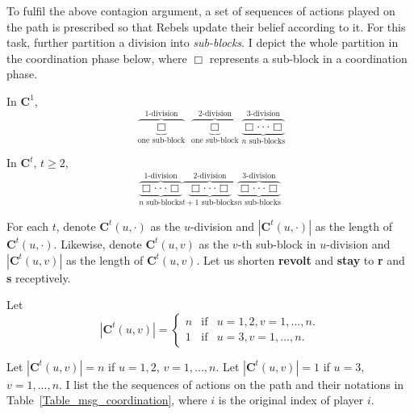 \documentclass[12pt,letter]{article}
\newcommand{\Kappa}{\mathbf{C}}
\theoremstyle{definition}
\theoremstyle{remark}
\theoremstyle{claim}
\begin{document}
To fulfil the above contagion argument, a set of sequences of actions played on the path is prescribed so that Rebels update their belief according to it. For this task, further partition a division into \textit{sub-blocks}. I depict the whole partition in the coordination phase below, where $\Box$ represents a sub-block in a coordination phase. 

In $\Kappa^1$, 
\[\overbrace{\underbrace{ \Box }_{\text{one sub-block}}}^{\text{$1$-division}} \overbrace{\underbrace{\Box }_{\text{one sub-block}}}^{\text{$2$-division}} \overbrace{\underbrace{\Box \cdot \cdot \cdot \Box}_{\text{$n$ sub-blocks}}}^{\text{$3$-division}}\] 

In $\Kappa^t$, $t\geq 2$,
\[\overbrace{\underbrace{\Box \cdot \cdot \cdot \Box}_{\text{$n$ sub-blocks}}}^{\text{$1$-division}} \overbrace{\underbrace{\Box \cdot \cdot \cdot \Box}_{\text{$t+1$ sub-blocks}} }^{\text{$2$-division}} \overbrace{\underbrace{\Box \cdot \cdot \cdot \Box}_{\text{$n$ sub-blocks}}}^{\text{$3$-division}}\] 




For each $t$, denote $\Kappa^t(u,\cdot)$ as the $u$-division and $|\Kappa^t(u,\cdot) |$ as the length of $\Kappa^t(u,\cdot)$. Likewise, denote $\Kappa^t(u,v)$ as the $v$-th sub-block in $u$-division and $|\Kappa^t(u,v) |$ as the length of $\Kappa^t(u,v)$. Let us shorten \textbf{revolt} and \textbf{stay} to \textbf{r} and \textbf{s} receptively. 

Let
\[
    |\Kappa^t(u,v)|=\left\{
                \begin{array}{lcl}
                  n & \text{if} & u=1,2, v=1,...,n.\\
                 1 & \text{if} & u=3, v=1,...,n.
                \end{array}
              \right. 
\]


Let $|\Kappa^t(u,v)|=n$ if $u=1,2$, $v=1,...,n$. Let $|\Kappa^t(u,v)|=1$ if $u=3$, $v=1,...,n$. I list the the sequences of actions on the path and their notations in Table~\ref{Table_msg_coordination}, where $i$ is the original index of player $i$.
\end{document}
